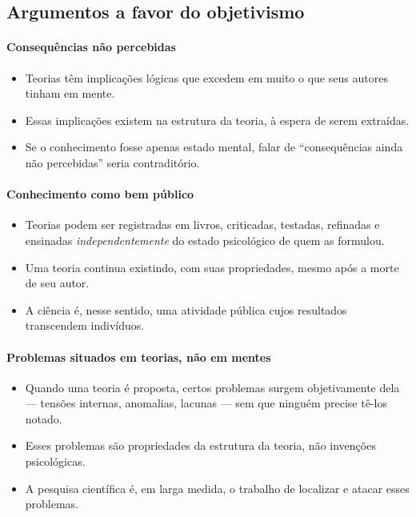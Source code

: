 \documentclass[9pt,a4paper]{extarticle}
\newcommand{\impt}[1]{\textcolor{important}{#1}}
\newcommand{\ntc}[1]{\textcolor{notice}{#1}}
\begin{document}
\subsection{Argumentos a favor do objetivismo}

\paragraph{Consequências não percebidas}
\begin{itemize}
    \item Teorias têm implicações lógicas que excedem em muito o que seus autores tinham em mente.
    \item Essas implicações \impt{existem na estrutura da teoria}, à espera de serem extraídas.
    \item Se o conhecimento fosse apenas estado mental, falar de ``consequências ainda não percebidas'' seria contraditório.
\end{itemize}

\paragraph{Conhecimento como bem público}
\begin{itemize}
    \item Teorias podem ser registradas em livros, criticadas, testadas, refinadas e ensinadas \emph{independentemente} do estado psicológico de quem as formulou.
    \item Uma teoria continua existindo, com suas propriedades, mesmo após a morte de seu autor.
    \item A ciência é, nesse sentido, uma \impt{atividade pública} cujos resultados transcendem indivíduos.
\end{itemize}

\paragraph{Problemas situados em teorias, não em mentes}
\begin{itemize}
    \item Quando uma teoria é proposta, certos \ntc{problemas surgem objetivamente} dela --- tensões internas, anomalias, lacunas --- sem que ninguém precise tê-los notado.
    \item Esses problemas são propriedades da estrutura da teoria, não invenções psicológicas.
    \item A pesquisa científica é, em larga medida, o trabalho de localizar e atacar esses problemas.
\end{itemize}
\end{document}
